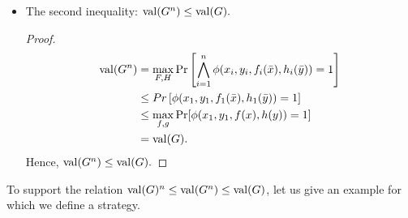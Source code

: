 \begin{itemize}
\begin{proof}
$(f,h)$ is the optimal couple of strategies for the game $G$, this does not means that the couple $(F,H)$  is the optimal couple of the strategies for the parallel repetition $G^n$. Then, the winning probability for $G^n$ over the optimal couple of strategies is:

\begin{align*}
\val (G^n)= & \max\limits_{F,H} \Pr \left[\bigwedge\limits_{i=1}^n \phi (x_i,y_i, f_i(\bar{x}), h_i(\bar{y}))=1 \right] \\
 \geq & \Pr \left[\bigwedge\limits_{i=1}^n \phi (x_i,y_i, f_i(\bar{x}), h_i(\bar{y}))=1 \right] \\
 = & \prod\limits_{i=1}^n \Pr \left[ \phi (x_i,y_i, f(\bar{x}), h(\bar{y}))=1 \right]\\
 = & \prod\limits_{i=1}^n \val (G) \\
 = & \val (G)^n .
\end{align*}

Hence, $\val (G^n) \geq \val (G)^n.$
\end{proof}

\item The second inequality: $\mathrm{val} (G^n) \leq \mathrm{val} (G).$

\begin{proof}
 \begin{align*}
 \mathrm{val} (G^n) & = \max\limits_{F,H} \Pr \left[\bigwedge\limits_{i=1}^n \phi (x_i,y_i, f_i(\bar{x}), h_i(\bar{y}))=1 \right] \\
 & \leq Pr \left[ \phi (x_1,y_1, f_1(\bar{x}), h_1(\bar{y}))=1 \right] \\
 &  \leq \max\limits_{f,g} \Pr[\phi(x_1,y_1,f(x),h(y))=1] \\
 & = \mathrm{val} (G).
 \end{align*}
Hence, $\mathrm{val} (G^n) \leq \mathrm{val} (G).$
\end{proof}
\end{itemize}

To support the relation $\mathrm{val} (G)^n \leq \mathrm{val} (G^n) \leq \mathrm{val} (G)$, let us give an example for which we define a strategy.

